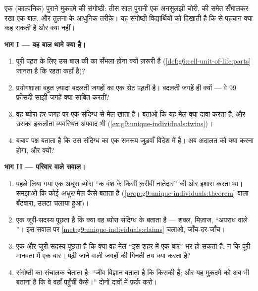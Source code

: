 \begin{problem}[{सप्ताहांत समस्या --- एक बाल, तीन सवाल, तीस
साल}]\label{pb:g9:unique-individuals:1}
एक (काल्पनिक) पुराने मुक़दमे की संगोष्ठी: तीस साल पुरानी एक अनसुलझी
चोरी,  की  समेत सँभालकर रखा एक बाल, और तुलना के आधुनिक
तरीक़े। यह संगोष्ठी विद्यार्थियों को दिखाती है कि  से पहचान क्या कह
सकती है और क्या नहीं।

\medskip\noindent\textbf{भाग I --- वह बाल थामे क्या है।}
\begin{enumerate}
  \item पूरी पढ़त के लिए उस बाल की \emph{} का सँभला होना क्यों
        ज़रूरी है (\cref{def:g6:cell-unit-of-life:parts} जानता है कि
         रहता कहाँ है)?
  \item प्रयोगशाला बहुत ज़्यादा बदलती जगहों का एक सेट पढ़ती है।
        बदलती जगहें ही क्यों --- वे 99 फ़ीसदी साझी जगहें क्या साबित
        करतीं?
  \item वह ब्योरा हर जगह पर एक संदिग्ध से मेल खाता है। बताओ कि यह मेल
        क्या दावा करता है, और उसका इकलौता व्यवस्थित अपवाद भी
        (\cref{ex:g9:unique-individuals:twins})।
  \item बचाव पक्ष बताता है कि उस संदिग्ध का एक समरूप जुड़वाँ विदेश में
        है। अब अदालत को क्या करना होगा, और क्यों?
\end{enumerate}

\medskip\noindent\textbf{भाग II --- परिवार वाले सवाल।}
\begin{enumerate}[resume]
  \item पहले लिया गया एक अधूरा ब्योरा ``क वंश के किसी क़रीबी नातेदार''
        की ओर इशारा करता था। समझाओ कि कोई \emph{अधूरा} मेल 
        कैसे बताता है
        (\cref{prop:g9:unique-individuals:theorem} वाला बँटवारा,
        उलटा चलाया हुआ)।
  \item एक जूरी-सदस्य पूछता है कि क्या वह ब्योरा संदिग्ध के 
        बताता है --- शक्ल, मिज़ाज, ``अपराध वाले ''। इस सवाल पर
        \cref{met:g9:unique-individuals:claims} चलाओ, जाँच-दर-जाँच।
  \item एक और जूरी-सदस्य पूछता है कि क्या वह मेल ``इस शहर में एक बार''
        भर हो सकता है, न कि पूरी मानवता में एक बार। पढ़ी जाने वाली
        जगहों की गिनती तय क्या करता है?
  \item संगोष्ठी का संचालक चेताता है: ``जीव विज्ञान बताता है कि
         किसकी हैं; और यह मुक़दमे को अब भी बताना है कि वे वहाँ
        पहुँचीं कैसे।'' दोनों दावों में फ़र्क़ करो।
\end{enumerate}


\end{problem}

